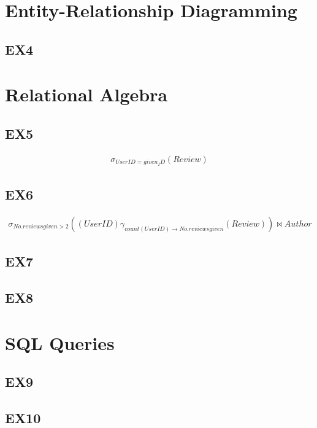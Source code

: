 \documentclass{article}
\begin{document}
	\section{Entity-Relationship Diagramming}
	
	\subsection{EX4}
	
	\section{Relational Algebra}
	
	\subsection{EX5}
	\begin{eqnarray}
	\sigma_{User ID = given_ID}(Review)
	\end{eqnarray}
		
	\subsection{EX6}
	\begin{eqnarray}
	\sigma _{No. reviews given > 2}((User ID) \gamma _{count(User ID) \rightarrow No. reviews given}(Review)) \bowtie Author
	\end{eqnarray}
	
	\subsection{EX7}
	
	\subsection{EX8}
	
	\section{SQL Queries}
	
	\subsection{EX9}
	
	\subsection{EX10}
	
\end{document}
